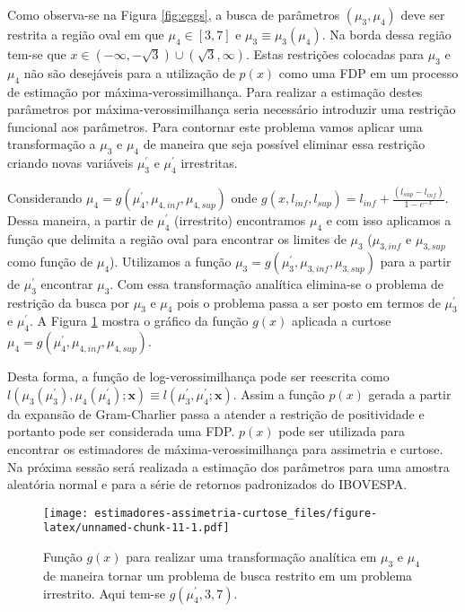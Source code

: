 \documentclass[]{article}
\begin{document}
Como observa-se na Figura \ref{fig:eggs}, a busca de parâmetros
\((\mu_3, \mu_4)\) deve ser restrita a região oval em que
\(\mu_4 \in [3,7]\) e \(\mu_3 \equiv \mu_3(\mu_4)\). Na borda dessa
região tem-se que
\(x \in (-\infty, -\sqrt{3}) \cup (\sqrt{3}, \infty)\). Estas restrições
colocadas para \(\mu_3\) e \(\mu_4\) não são desejáveis para a
utilização de \(p(x)\) como uma FDP em um processo de estimação por
máxima-verossimilhança. Para realizar a estimação destes parâmetros por
máxima-verossimilhança seria necessário introduzir uma restrição
funcional aos parâmetros. Para contornar este problema vamos aplicar uma
transformação a \(\mu_3\) e \(\mu_4\) de maneira que seja possível
eliminar essa restrição criando novas variáveis \(\mu_3^\prime\) e
\(\mu_4^\prime\) irrestritas.

Considerando \(\mu_4 = g(\mu_4^\prime, \mu_{4,inf}, \mu_{4,sup})\) onde
\(g(x, l_{inf}, l_{sup}) = l_{inf} + \frac{(l_{sup} - l_{inf})}{1 - e^{-x}}\).
Dessa maneira, a partir de \(\mu_4^\prime\) (irrestrito) encontramos
\(\mu_4\) e com isso aplicamos a função que delimita a região oval para
encontrar os limites de \(\mu_3\) (\(\mu_{3,inf}\) e \(\mu_{3,sup}\)
como função de \(\mu_4\)). Utilizamos a função
\(\mu_3 = g(\mu_3^\prime, \mu_{3,inf}, \mu_{3,sup})\) para a partir de
\(\mu_3^\prime\) encontrar \(\mu_3\). Com essa transformação analítica
elimina-se o problema de restrição da busca por \(\mu_3\) e \(\mu_4\)
pois o problema passa a ser posto em termos de \(\mu_3^\prime\) e
\(\mu_4^\prime\). A Figura \ref{fig:limit-transform} mostra o gráfico da
função \(g(x)\) aplicada a curtose
\(\mu_4 = g(\mu_4^\prime, \mu_{4,inf}, \mu_{4,sup})\).

Desta forma, a função de log-verossimilhança pode ser reescrita como
\(l(\mu_3(\mu_3^\prime), \mu_4(\mu_4^\prime); \mathbf{x}) \equiv l(\mu_3^\prime, \mu_4^\prime; \mathbf{x})\).
Assim a função \(p(x)\) gerada a partir da expansão de Gram-Charlier
passa a atender a restrição de positividade e portanto pode ser
considerada uma FDP. \(p(x)\) pode ser utilizada para encontrar os
estimadores de máxima-verossimilhança para assimetria e curtose. Na
próxima sessão será realizada a estimação dos parâmetros para uma
amostra aleatória normal e para a série de retornos padronizados do
IBOVESPA.

\begin{figure}
\centering
\texttt{[image: estimadores-assimetria-curtose\_files/figure-latex/unnamed-chunk-11-1.pdf]}
\caption{\label{fig:limit-transform} Função \(g(x)\) para realizar uma
transformação analítica em \(\mu_3\) e \(\mu_4\) de maneira tornar um
problema de busca restrito em um problema irrestrito. Aqui tem-se
\(g(\mu_4^\prime, 3, 7)\).}
\end{figure}
\end{document}
